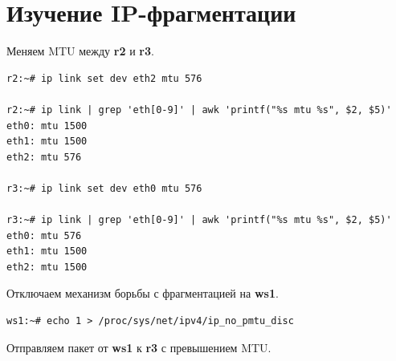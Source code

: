 \documentclass[a4paper,12pt]{article}
\begin{document}
\section{Изучение IP-фрагментации}

Меняем MTU между \textbf{r2} и \textbf{r3}.

\begin{Verbatim}
r2:~# ip link set dev eth2 mtu 576

r2:~# ip link | grep 'eth[0-9]' | awk 'printf("%s mtu %s", $2, $5)'
eth0: mtu 1500
eth1: mtu 1500
eth2: mtu 576

r3:~# ip link set dev eth0 mtu 576

r3:~# ip link | grep 'eth[0-9]' | awk 'printf("%s mtu %s", $2, $5)' 
eth0: mtu 576
eth1: mtu 1500
eth2: mtu 1500
\end{Verbatim}

Отключаем механизм борьбы с фрагментацией на \textbf{ws1}.

\begin{Verbatim}
ws1:~# echo 1 > /proc/sys/net/ipv4/ip_no_pmtu_disc
\end{Verbatim}

Отправляем пакет от \textbf{ws1} к \textbf{r3} с превышением MTU.
\end{document}
